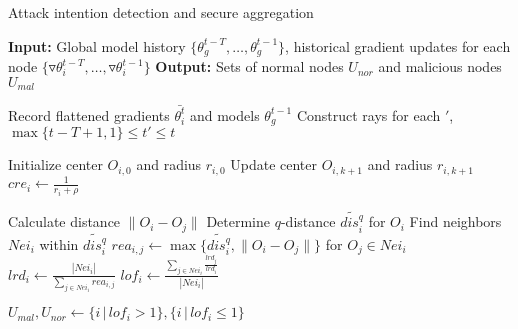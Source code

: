 \documentclass[lettersize,journal]{IEEEtran}
\begin{document}
\begin{algorithm}
\caption{Attack intention detection and secure aggregation}
\label{alg:malicious-node-detection-history}
\begin{algorithmic}[1]
\State \textbf{Input:} Global model history $\{\theta_g^{t-T}, \dots, \theta_g^{t-1}\}$, historical gradient updates for each node $\{\triangledown \theta_{i}^{t-T}, \dots, \triangledown \theta_{i}^{t-1}\}$
\State \textbf{Output:} Sets of normal nodes $U_{nor}$ and malicious nodes $U_{mal}$



    \State Record flattened gradients $\bar{\theta_i^t}$ and models $\theta_g^{t-1}$
    \State Construct rays for each $'$, $\max\{t-T+1, 1\}\leq t' \leq t$



    \State Initialize center $O_{i,0}$ and radius $r_{i,0}$
        \State Update center $O_{i,k+1}$ and radius $r_{i,k+1}$
    \EndWhile
    \State  $cre_i  \gets \frac{1}{r_i + \rho}$ 



        \State Calculate distance $\|O_i - O_j\|$
    \EndFor
    \State Determine $q$-distance $\widetilde{dis_i^q}$ for $O_i$
    \State Find neighbors $Nei_i$ within $\widetilde{dis_i^q}$
    \State $rea_{i,j}  \gets \max\{\widetilde{dis_i^q}, \|O_i - O_j\|\}$ for $O_j \in Nei_i$  
    \State  $lrd_i  \gets \frac{|Nei_i|}{\sum_{j \in Nei_i} rea_{i,j}}$ 
    \State $lof_i  \gets \frac{\sum_{j \in Nei_i} \frac{lrd_j}{lrd_i}}{|Nei_i|}$

\State $U_{mal}, U_{nor}  \gets \{i \,|\, lof_i > 1\}, \{i \,|\, lof_i \leq 1\}$


\end{algorithmic}
\end{algorithm}
\end{document}
